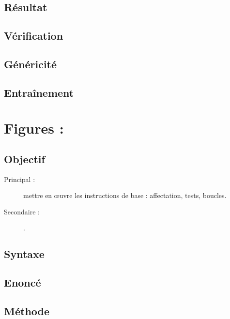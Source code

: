 \subsection{Résultat}\label{instructions:nombres:resultat}

\subsection{Vérification}\label{instructions:nombres:verification}

\subsection{Généricité}\label{instructions:nombres:genericite}

\subsection{Entraînement}\label{instructions:nombres:entrainement}

\section{Figures : }\label{instructions:figures}

\subsection{Objectif}\label{instructions:figures:objectif}
\begin{description}
\item[Principal : ] mettre en \oe uvre les instructions de base : affectation, tests, boucles.
\item[Secondaire :] .
\end{description}


\subsection{Syntaxe \python}\label{instructions:figures:python}

\subsection{Enoncé}\label{instructions:figures:enonce}

\subsection{Méthode}\label{instructions:figures:methode}

